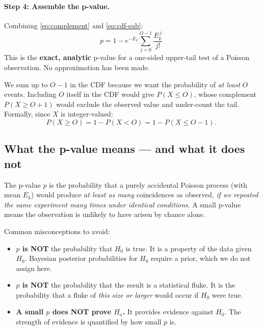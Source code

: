 \documentclass[12pt]{article}
\theoremstyle{definition}
\theoremstyle{remark}
\newenvironment{keybox}[1]{%
  \begin{tcolorbox}[colback=blue!5!white, colframe=blue!40!black,
      fonttitle=\bfseries, title={#1}, breakable]%
}{%
  \end{tcolorbox}%
}
\newenvironment{warnbox}[1]{%
  \begin{tcolorbox}[colback=orange!8!white, colframe=orange!60!black,
      fonttitle=\bfseries, title={#1}, breakable]%
}{%
  \end{tcolorbox}%
}
\newcommand{\Prob}[1]{P\!\left(#1\right)}
\newcommand{\Ho}{H_0}
\newcommand{\Ha}{H_a}
\newcommand{\obs}{O}
\newcommand{\Eacc}{E}
\begin{document}
\paragraph{Step 4: Assemble the p-value.}
Combining \eqref{eq:complement} and \eqref{eq:cdf-sub}:
\begin{equation}
  \boxed{
    p = 1 - e^{-\Eacc_k}\sum_{j=0}^{\obs-1}\frac{\Eacc_k^{\,j}}{j!}
  }
  \tag{7.1}
  \label{eq:pval}
\end{equation}
This is the \textbf{exact, analytic} p-value for a one-sided upper-tail
test of a Poisson observation.  No approximation has been made.

\begin{warnbox}{Why $\obs - 1$, not $\obs$?}
  We sum up to $\obs - 1$ in the CDF because we want the probability of
  \emph{at least} $\obs$ events.  Including $\obs$ itself in the CDF
  would give $\Prob{X \le \obs}$, whose complement $\Prob{X \ge \obs +
  1}$ would exclude the observed value and under-count the tail.
  Formally, since $X$ is integer-valued:
  \[
    \Prob{X \ge \obs} = 1 - \Prob{X < \obs} = 1 - \Prob{X \le \obs-1}.
  \]
\end{warnbox}

\subsection{What the p-value means — and what it does not}

\begin{keybox}{Correct interpretation of the p-value}
  The p-value $p$ is the probability that a purely accidental Poisson
  process (with mean $\Eacc_k$) would produce \emph{at least as many}
  coincidences as observed, \emph{if we repeated the same experiment
  many times under identical conditions}.  A small p-value means the
  observation is unlikely to have arisen by chance alone.
\end{keybox}

Common misconceptions to avoid:

\begin{itemize}
  \item \textbf{$p$ is NOT} the probability that $\Ho$ is true.  It is a
        property of the data given $\Ho$.  Bayesian posterior
        probabilities for $\Ho$ require a prior, which we do not assign
        here.

  \item \textbf{$p$ is NOT} the probability that the result is a
        statistical fluke.  It is the probability that a fluke of
        \emph{this size or larger} would occur if $\Ho$ were true.

  \item \textbf{A small $p$ does NOT prove $\Ha$.}  It provides
        evidence against $\Ho$.  The strength of evidence is
        quantified by how small $p$ is.
\end{itemize}
\end{document}
